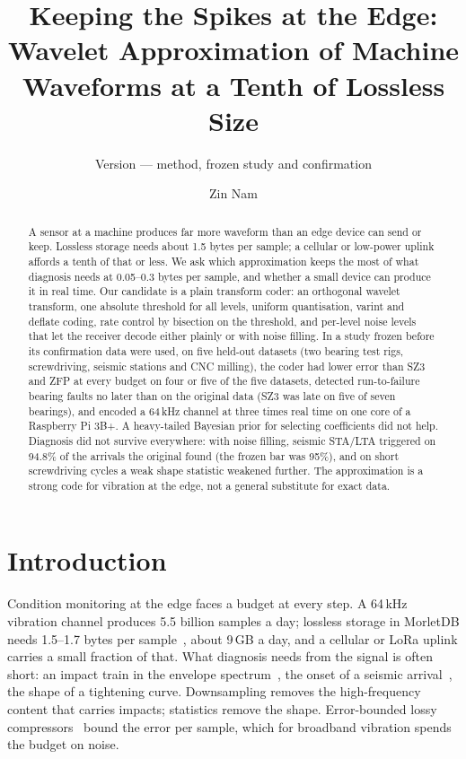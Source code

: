 \documentclass[sigconf,nonacm]{acmart}
\newcommand{\M}{MorletDB}
\newcommand{\ReportVersion}{\unskip}
\begin{document}
\title{Keeping the Spikes at the Edge: Wavelet Approximation of Machine Waveforms at a Tenth of Lossless Size}
\subtitle{Version \ReportVersion{} --- method, frozen study and confirmation}
\author{Zin Nam}

\begin{abstract}
A sensor at a machine produces far more waveform than an edge device can send or keep. Lossless storage needs about 1.5 bytes per sample; a cellular or low-power uplink affords a tenth of that or less. We ask which approximation keeps the most of what diagnosis needs at 0.05--0.3 bytes per sample, and whether a small device can produce it in real time. Our candidate is a plain transform coder: an orthogonal wavelet transform, one absolute threshold for all levels, uniform quantisation, varint and deflate coding, rate control by bisection on the threshold, and per-level noise levels that let the receiver decode either plainly or with noise filling. In a study frozen before its confirmation data were used, on five held-out datasets (two bearing test rigs, screwdriving, seismic stations and CNC milling), the coder had lower error than SZ3 and ZFP at every budget on four or five of the five datasets, detected run-to-failure bearing faults no later than on the original data (SZ3 was late on five of seven bearings), and encoded a 64\,kHz channel at three times real time on one core of a Raspberry Pi 3B+. A heavy-tailed Bayesian prior for selecting coefficients did not help. Diagnosis did not survive everywhere: with noise filling, seismic STA/LTA triggered on 94.8\% of the arrivals the original found (the frozen bar was 95\%), and on short screwdriving cycles a weak shape statistic weakened further. The approximation is a strong code for vibration at the edge, not a general substitute for exact data.
\end{abstract}

\maketitle

\section{Introduction}
Condition monitoring at the edge faces a budget at every step. A 64\,kHz vibration channel produces 5.5 billion samples a day; lossless storage in \M{} needs 1.5--1.7 bytes per sample~\cite{morletdb}, about 9\,GB a day, and a cellular or LoRa uplink carries a small fraction of that. What diagnosis needs from the signal is often short: an impact train in the envelope spectrum~\cite{randall2011,antoni2006}, the onset of a seismic arrival~\cite{allen1978,withers1998}, the shape of a tightening curve. Downsampling removes the high-frequency content that carries impacts; statistics remove the shape. Error-bounded lossy compressors~\cite{di2016,liang2023,lindstrom2014} bound the error per sample, which for broadband vibration spends the budget on noise.
\end{document}

